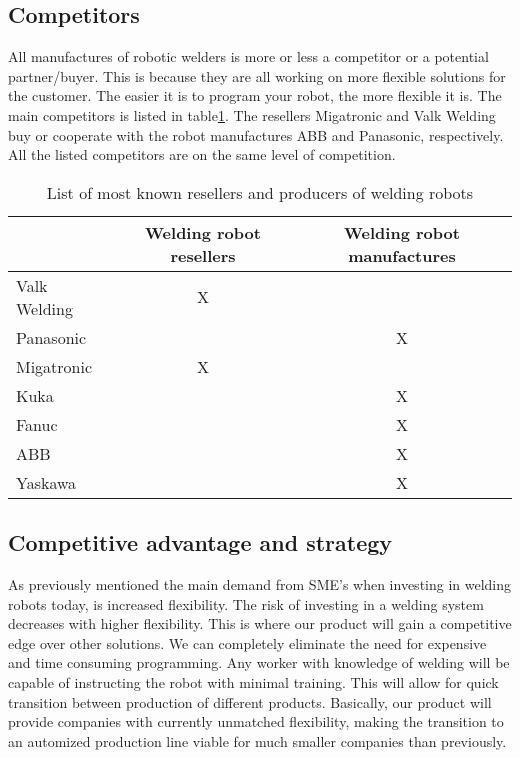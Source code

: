\subsection{Competitors}
\label{competitors}
All manufactures of robotic welders is more or less a competitor or a potential partner/buyer. This is because they are all working on more flexible solutions for the customer. The easier it is to program your robot, the more flexible it is. The main competitors is listed in table\ref{Tablecompetitors}. The resellers Migatronic and Valk Welding buy or cooperate with the  robot manufactures ABB and Panasonic, respectively. All the listed competitors are on the same level of competition.

\begin{table}[h]
\centering
\begin{tabular}{|l|c|c|}
\hline
             & Welding robot resellers & Welding robot manufactures \\ 
\hline
Valk Welding & X                       &  \\ 
\hline
Panasonic    &                         & X \\ 
\hline
Migatronic   & X                       &  \\ 
\hline
Kuka         &                         & X \\ 
\hline                                 
Fanuc        &                         & X \\ 
\hline                                 
ABB          &                         & X \\ 
\hline                                 
Yaskawa      &                         & X \\ 
\hline
\end{tabular} 
\caption{List of most known resellers and producers of welding robots}
\label{Tablecompetitors}
\end{table}


\subsection{Competitive advantage and strategy}
As previously mentioned the main demand from SME's when investing in welding robots today, is increased flexibility.
 The risk of investing in a welding system decreases with higher flexibility. This is where our product will gain a competitive edge over other solutions. We can completely eliminate the need for expensive and time consuming programming. Any worker with knowledge of welding will be capable of instructing the robot with minimal training. This will allow for quick transition between production of different products. Basically, our product will provide companies with currently unmatched flexibility, making the transition to an automized production line viable for much smaller companies than previously.
